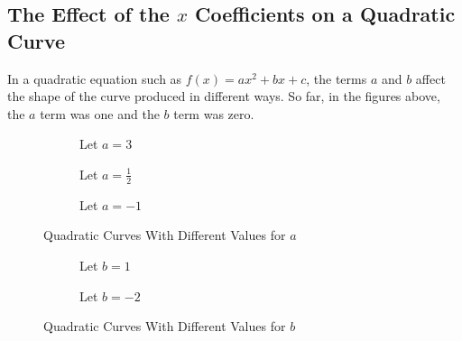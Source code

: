 \documentclass[a5paper,9pt]{book}
\theoremstyle{definition}
\begin{document}
        \subsection{The Effect of the $x$ Coefficients on a Quadratic Curve}

        In a quadratic equation such as $f(x)=ax^2+bx+c$, the terms $a$ and $b$ affect
        the shape of the curve produced in different ways. So far, in the figures above,
        the $a$ term was one and the $b$ term was zero.

        \pagebreak

        \begin{figure}[ht]
            \centering
            \begin{subfigure}{.45\textwidth}
                \centering
                
                \caption{Let $a=3$}\label{fig:quadratic_curves_with_different_values_for_A_a}
            \end{subfigure}
            \begin{subfigure}{.45\textwidth}
                \centering
                
                \caption{Let $a=\frac{1}{2}$}\label{fig:quadratic_curves_with_different_values_for_A_b}
            \end{subfigure}
            \begin{subfigure}{.45\textwidth}
                \centering
                
                \caption{Let $a=-1$}\label{fig:quadratic_curves_with_different_values_for_A_c}
            \end{subfigure}
            \caption{Quadratic Curves With Different Values for $a$}\label{fig:quadratic_curves_with_different_values_for_A}
        \end{figure}
        \begin{figure}[ht!]
            \centering
            \begin{subfigure}{.45\textwidth}
                \centering
                
                \caption{Let $b=1$}\label{fig:quadratic_curves_with_different_values_for_A_a}
            \end{subfigure}
            \begin{subfigure}{.45\textwidth}
                \centering
                
                \caption{Let $b=-2$}\label{fig:quadratic_curves_with_different_values_for_A_b}
            \end{subfigure}
            \caption{Quadratic Curves With Different Values for $b$}\label{fig:quadratic_curves_with_different_values_for_B}
        \end{figure}
\end{document}
